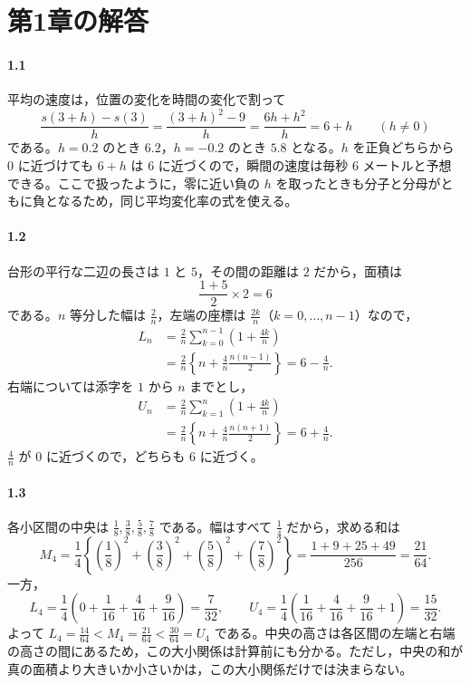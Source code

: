 \section{第1章の解答}\label{解答:第1章}
\paragraph{1.1}
平均の速度は，位置の変化を時間の変化で割って
\[
 \frac{s(3+h)-s(3)}h
 =\frac{(3+h)^2-9}{h}
 =\frac{6h+h^2}{h}=6+h \qquad(h\ne0)
\]
である。$h=0.2$ のとき $6.2$，$h=-0.2$ のとき $5.8$ となる。$h$ を正負どちらから $0$ に近づけても $6+h$ は $6$ に近づくので，瞬間の速度は毎秒 $6$ メートルと予想できる。ここで扱ったように，零に近い負の $h$ を取ったときも分子と分母がともに負となるため，同じ平均変化率の式を使える。

\paragraph{1.2}
台形の平行な二辺の長さは $1$ と $5$，その間の距離は $2$ だから，面積は
\[
 \frac{1+5}{2}\times2=6
\]
である。$n$ 等分した幅は $\frac2n$，左端の座標は $\frac{2k}{n}$（$k=0,\ldots,n-1$）なので，
\begin{align*}
 L_n
 &=\frac2n\sum_{k=0}^{n-1}\left(1+\frac{4k}{n}\right)\\
 &=\frac2n\left\{n+\frac4n\frac{n(n-1)}2\right\}
 =6-\frac4n.
\end{align*}
右端については添字を $1$ から $n$ までとし，
\begin{align*}
 U_n
 &=\frac2n\sum_{k=1}^{n}\left(1+\frac{4k}{n}\right)\\
 &=\frac2n\left\{n+\frac4n\frac{n(n+1)}2\right\}
 =6+\frac4n.
\end{align*}
$\frac4n$ が $0$ に近づくので，どちらも $6$ に近づく。

\paragraph{1.3}
各小区間の中央は $\frac18,\frac38,\frac58,\frac78$ である。幅はすべて $\frac14$ だから，求める和は
\[
 M_4=\frac14\left\{\left(\frac18\right)^2
 +\left(\frac38\right)^2+\left(\frac58\right)^2
 +\left(\frac78\right)^2\right\}
 =\frac{1+9+25+49}{256}=\frac{21}{64}.
\]
一方，
\[
 L_4=\frac14\left(0+\frac1{16}+\frac4{16}+\frac9{16}\right)=\frac7{32},
 \qquad
 U_4=\frac14\left(\frac1{16}+\frac4{16}+\frac9{16}+1\right)=\frac{15}{32}.
\]
よって $L_4=\frac{14}{64}<M_4=\frac{21}{64}<\frac{30}{64}=U_4$ である。中央の高さは各区間の左端と右端の高さの間にあるため，この大小関係は計算前にも分かる。ただし，中央の和が真の面積より大きいか小さいかは，この大小関係だけでは決まらない。

